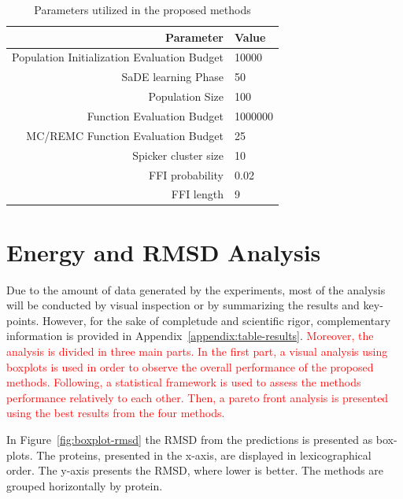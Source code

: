 \begin{table}[ht]
    \centering
    \begin{tabular}{r|l} \hline \hline
        Parameter & Value \\ \hline \hline
        Population Initialization Evaluation Budget & 10000 \\ \hline
        SaDE learning Phase & 50 \\ \hline
        Population Size & 100 \\ \hline
        Function Evaluation Budget & 1000000 \\ \hline
        MC/REMC Function Evaluation Budget & 25 \\ \hline
        Spicker cluster size & 10 \\ \hline
        \ac{FFI} probability & 0.02 \\ \hline
        \ac{FFI} length & 9 \\ \hline \hline
    \end{tabular}
    \caption{Parameters utilized in the proposed methods}
    \label{tab:parameters}
\end{table}

\section{Energy and RMSD Analysis}\label{sec:methods-analysis}

Due to the amount of data generated by the experiments, most of the analysis will
be conducted by visual inspection or by summarizing the results and key-points.
However, for the sake of completude and scientific rigor, complementary
information is provided in Appendix~\ref{appendix:table-results}.
\textcolor{red}{
Moreover, the analysis is divided in three main parts. In the first part, a visual
analysis using boxplots is used in order to observe the overall performance of
the proposed methods. Following, a statistical framework is used to assess the methods
performance relatively to each other. Then, a pareto front analysis is presented
using the best results from the four methods.
}

In Figure~\ref{fig:boxplot-rmsd} the RMSD from the predictions is presented as box-plots.
The proteins, presented in the x-axis, are displayed in lexicographical order.
The y-axis presents the RMSD, where lower is better. The methods are grouped
horizontally by protein.

